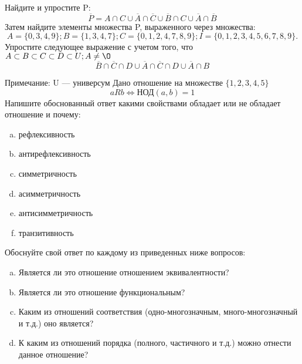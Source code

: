 \documentclass[10pt]{exam}
\begin{document}
\begin{questions}
\question
Найдите и упростите P:
\begin{equation*}
\overline{P} = A \cap C \cup \overline{A} \cap \overline{C} \cup \overline{B} \cap C \cup \overline{A} \cap \overline{B}
\end{equation*}
Затем найдите элементы множества P, выраженного через множества:
\begin{equation*}
A = \{0, 3, 4, 9\}; 
B = \{1, 3, 4, 7\};
C = \{0, 1, 2, 4, 7, 8, 9\};
I = \{0, 1, 2, 3, 4, 5, 6, 7, 8, 9\}.
\end{equation*}\question
Упростите следующее выражение с учетом того, что $A\subset B \subset C \subset D \subset U; A \neq \O$
\begin{equation*}
\overline{B} \cap \overline{C} \cap D \cup \overline{A} \cap \overline{C} \cap D \cup \overline{A} \cap B
\end{equation*}

Примечание: U — универсум\question
Дано отношение на множестве $\{1, 2, 3, 4, 5\}$ 
\begin{equation*}
aRb \iff  \text{НОД}(a,b) =1
\end{equation*}
Напишите обоснованный ответ какими свойствами обладает или не обладает отношение и почему:   
\begin{enumerate} [a)]\setcounter{enumi}{0}
\item рефлексивность
\item антирефлексивность
\item симметричность
\item асимметричность
\item антисимметричность
\item транзитивность
\end{enumerate}

Обоснуйте свой ответ по каждому из приведенных ниже вопросов:
\begin{enumerate} [a)]\setcounter{enumi}{0}
    \item Является ли это отношение отношением эквивалентности?
    \item Является ли это отношение функциональным?
    \item Каким из отношений соответствия (одно-многозначным, много-многозначный и т.д.) оно является?
    \item К каким из отношений порядка (полного, частичного и т.д.) можно отнести данное отношение?
\end{enumerate}



\end{questions}
\end{document}
